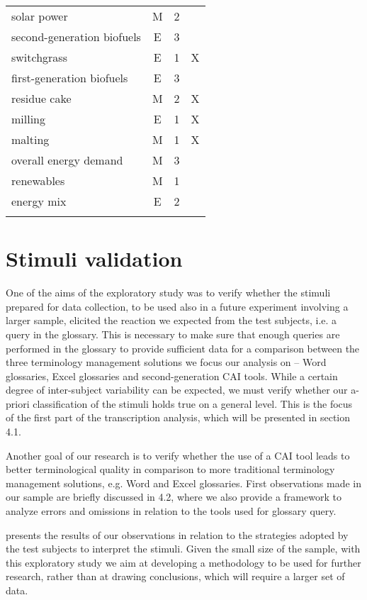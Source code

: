 \documentclass[output=paper]{langsci/langscibook}
\begin{document}
\begin{table}
\begin{tabularx}{\linewidth}{Xccc}
solar power & M & 2 & \\
second-generation biofuels & E & 3 & \\
switchgrass & E & 1 & X\\
first-generation biofuels & E & 3 & \\
residue cake & M & 2 & X\\
milling & E & 1 & X\\
malting & M & 1 & X\\
overall energy demand & M & 3 & \\
renewables & M & 1 & \\
energy mix & E & 2 & \\
\lspbottomrule
\end{tabularx}
\end{table}

\section{Stimuli validation}\label{sec:prandi:5}
One of the aims of the exploratory study was to verify whether the stimuli prepared for data collection, to be used also in a future experiment involving a larger sample, elicited the reaction we expected from the test subjects, i.e. a query in the glossary. This is necessary to make sure that enough queries are performed in the glossary to provide sufficient data for a comparison between the three terminology management solutions we focus our analysis on – Word glossaries, Excel glossaries and second-generation \textsc{CAI} tools. While a certain degree of inter-subject variability can be expected, we must verify whether our a-priori classification of the stimuli holds true on a general level. This is the focus of the first part of the transcription analysis, which will be presented in section 4.1.

Another goal of our research is to verify whether the use of a \textsc{CAI} tool leads to better terminological quality in comparison to more traditional terminology management solutions, e.g. Word and Excel glossaries. First observations made in our sample are briefly discussed in 4.2, where we also provide a framework to analyze errors and omissions in relation to the tools used for glossary query.

 presents the results of our observations in relation to the strategies adopted by the test subjects to interpret the stimuli. Given the small size of the sample, with this exploratory study we aim at developing a methodology to be used for further research, rather than at drawing conclusions, which will require a larger set of data. 
\end{document}
